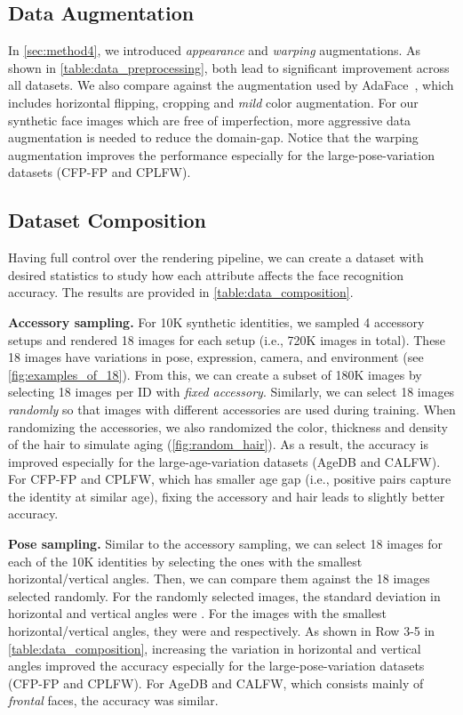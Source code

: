 \documentclass[10pt,twocolumn,letterpaper]{article}
\begin{document}
\subsection{Data Augmentation}
\label{sec:exp1}

In \autoref{sec:method4}, we introduced \textit{appearance} and \textit{warping} augmentations. 
As shown in \autoref{table:data_preprocessing}, both lead to significant improvement across all datasets. 
We also compare against the augmentation used by AdaFace~\cite{2022_FR_adaface}, which includes horizontal flipping, cropping and \textit{mild} color augmentation.
For our synthetic face images which are free of imperfection, more aggressive data augmentation is needed to reduce the domain-gap. 
Notice that the warping augmentation improves the performance especially for the large-pose-variation datasets (CFP-FP and CPLFW). 

\subsection{Dataset Composition}
\label{sec:exp2}

Having full control over the rendering pipeline, we can create a dataset with desired statistics to study how each attribute affects the face recognition accuracy.
The results are provided in \autoref{table:data_composition}. 

\noindent
\textbf{Accessory sampling.} 
For 10K synthetic identities, we sampled 4 accessory setups and rendered 18 images for each setup (i.e., 720K images in total). 
These 18 images have variations in pose, expression, camera, and environment (see \autoref{fig:examples_of_18}). 
From this, we can create a subset of 180K images by selecting 18 images per ID with \textit{fixed accessory}. 
Similarly, we can select 18 images \textit{randomly} so that images with different accessories are used during training. 
When randomizing the accessories, we also randomized the color, thickness and density of the hair to simulate aging (\autoref{fig:random_hair}). 
As a result, the accuracy is improved especially for the large-age-variation datasets (AgeDB and CALFW). 
For CFP-FP and CPLFW, which has smaller age gap (i.e., positive pairs capture the identity at similar age), fixing the accessory and hair leads to slightly better accuracy.

\noindent
\textbf{Pose sampling.} 
Similar to the accessory sampling, we can select 18 images for each of the 10K identities by selecting the ones with the smallest horizontal/vertical angles.
Then, we can compare them against the 18 images selected randomly. 
For the randomly selected images, the standard deviation in horizontal and vertical angles were . 
For the images with the smallest horizontal/vertical angles, they were  and  respectively. 
As shown in Row 3-5 in \autoref{table:data_composition}, increasing the variation in horizontal and vertical angles improved the accuracy especially for the large-pose-variation datasets (CFP-FP and CPLFW). 
For AgeDB and CALFW, which consists mainly of \textit{frontal} faces, the accuracy was similar.
\end{document}
